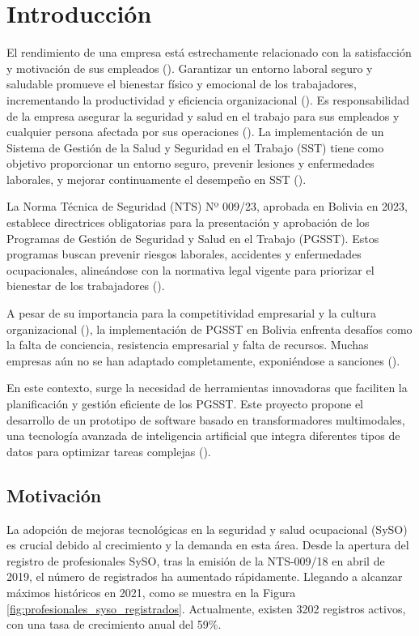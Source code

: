 \chapter{Introducción}
\label{sec:introduction}
El rendimiento de una empresa está estrechamente relacionado con la satisfacción y motivación de sus empleados (\cite{krekel2019employee}). Garantizar un entorno laboral seguro y saludable promueve el bienestar físico y emocional de los trabajadores, incrementando la productividad y eficiencia organizacional (\cite{martinez2021oit}). Es responsabilidad de la empresa asegurar la seguridad y salud en el trabajo para sus empleados y cualquier persona afectada por sus operaciones (\cite{Bolivia1979}). La implementación de un Sistema de Gestión de la Salud y Seguridad en el Trabajo (SST) tiene como objetivo proporcionar un entorno seguro, prevenir lesiones y enfermedades laborales, y mejorar continuamente el desempeño en SST (\cite{iso45001}).

La Norma Técnica de Seguridad (NTS) Nº 009/23, aprobada en Bolivia en 2023, establece directrices obligatorias para la presentación y aprobación de los Programas de Gestión de Seguridad y Salud en el Trabajo (PGSST). Estos programas buscan prevenir riesgos laborales, accidentes y enfermedades ocupacionales, alineándose con la normativa legal vigente para priorizar el bienestar de los trabajadores (\cite{cahuasiquitadiseno}).

A pesar de su importancia para la competitividad empresarial y la cultura organizacional (\cite{moran2022practicas}), la implementación de PGSST en Bolivia enfrenta desafíos como la falta de conciencia, resistencia empresarial y falta de recursos. Muchas empresas aún no se han adaptado completamente, exponiéndose a sanciones (\cite{cervantesdiagnostico}).

En este contexto, surge la necesidad de herramientas innovadoras que faciliten la planificación y gestión eficiente de los PGSST. Este proyecto propone el desarrollo de un prototipo de software basado en transformadores multimodales, una tecnología avanzada de inteligencia artificial que integra diferentes tipos de datos para optimizar tareas complejas (\cite{xu2023multimodal}).

\section{Motivación}
La adopción de mejoras tecnológicas en la seguridad y salud ocupacional (SySO) es crucial debido al crecimiento y la demanda en esta área. Desde la apertura del registro de profesionales SySO, tras la emisión de la NTS-009/18 en abril de 2019, el número de registrados ha aumentado rápidamente. Llegando a alcanzar máximos históricos en 2021, como se muestra en la Figura \ref{fig:profesionales_syso_registrados}. Actualmente, existen 3202 registros activos, con una tasa de crecimiento anual del 59\%.

